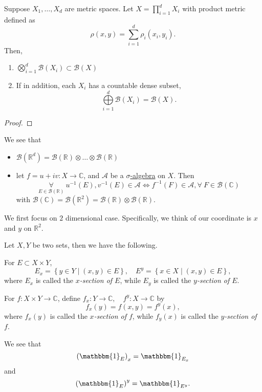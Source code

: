 \begin{theorem}
	Suppose \(X_1, \ldots , X_d \) are metric spaces. Let \(X = \prod\limits_{i=1}^{d} X_{i}\) with product metric defined as
	\[
		\rho (x, y) = \sum\limits_{i=1}^{d} \rho _{i}(x_{i}, y_{i}).
	\]
	Then,
	\begin{enumerate}[(1)]
		\item \(\bigotimes\limits_{i=1}^{d}\mathcal{B} (X_{i})\subset \mathcal{B} (X)\)
		\item If in addition, each \(X_{i}\) has a countable dense subset,
		      \[
			      \bigoplus\limits_{i=1}^{d}\mathcal{B} (X_{i}) = \mathcal{B} (X).
		      \]
	\end{enumerate}
\end{theorem}
\begin{proof}
\end{proof}

\begin{remark}
	We see that
	\begin{itemize}
		\item \(\mathcal{B} (\mathbb{R} ^d) = \mathcal{B} (\mathbb{R} )\otimes \ldots \otimes \mathcal{B} (\mathbb{R} ) \)
		\item let \(f = u + iv\colon X\to \mathbb{C} \), and \(\mathcal{A} \) be a \hyperref[def:sigma-algebra]{\(\sigma\)-algebra} on \(X\). Then
		      \[
			      \underset{E\in \mathcal{B} (\mathbb{R} )}{\forall }\ u^{-1} (E), v^{-1} (E)\in \mathcal{A}
			      \iff
			      f^{-1} (F)\in \mathcal{A}, \forall\ F\in \mathcal{B} (\mathbb{C} )
		      \]
		      with \(\mathcal{B} (\mathbb{C} ) = \mathcal{B} (\mathbb{R} ^2) = \mathcal{B} (\mathbb{R} )\otimes \mathcal{B} (\mathbb{R} )\).
	\end{itemize}
\end{remark}

We first focus on \(2\) dimensional case. Specifically, we think of our coordinate is \(x\) and \(y\) on \(\mathbb{R} ^2\).

\begin{definition*}
	Let \(X, Y\) be two sets, then we have the following.
	\begin{definition}
		For \(E\subset X\times Y\),
		\[
			E_x = \left\{y\in Y \mid (x, y)\in E\right\},\quad E^y = \left\{x\in X \mid (x, y)\in E\right\},
		\]
		where \(E_x\) is called the \emph{\(x\)-section of \(E\)}, while \(E_y\) is called the \emph{\(y\)-section of \(E\)}.
	\end{definition}
	\begin{definition}
		For \(f\colon X\times Y\to \mathbb{C} \), define \(f_x\colon Y\to \mathbb{C} ,\quad f^y\colon X\to \mathbb{C}\)
		by
		\[
			f_x(y) = f(x, y) = f^y(x),
		\]
		where \(f_x(y)\) is called the \emph{\(x\)-section of \(f\)}, while \(f_y(x)\) is called the \emph{\(y\)-section of \(f\)}.
	\end{definition}
\end{definition*}
\begin{eg}
	We see that
	\[
		\left(\mathbbm{1}_{E} \right)_x = \mathbbm{1}_{E_x}
	\]
	and
	\[
		\left(\mathbbm{1}_{E} \right)^y = \mathbbm{1}_{E^y}.
	\]
\end{eg}

